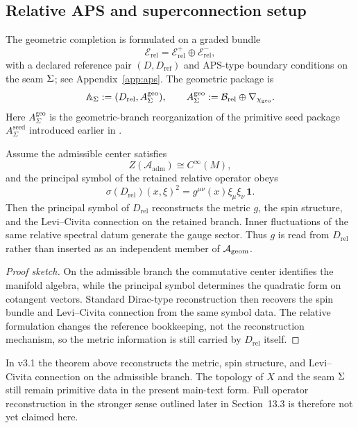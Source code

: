 \subsection{Relative APS and superconnection setup}

The geometric completion is formulated on a graded bundle
\[
\mathcal E_{\mathrm{rel}}=\mathcal E_{\mathrm{rel}}^+\oplus\mathcal E_{\mathrm{rel}}^-,
\]
with a declared reference pair $(D,D_{\mathrm{ref}})$ and APS-type boundary conditions on the seam $\Sigma$; see Appendix~\ref{app:aps}. The geometric package is
\[
\mathbb A_{\Sigma}:=(D_{\mathrm{rel}},A_{\Sigma}^{\mathrm{geo}}),
\qquad
A_{\Sigma}^{\mathrm{geo}}:=\mathcal B_{\mathrm{rel}}\oplus\nabla_{\chi_{\mathrm{geo}}}.
\]
Here $A_{\Sigma}^{\mathrm{geo}}$ is the geometric-branch reorganization of the primitive seed package $A_{\Sigma}^{\mathrm{seed}}$ introduced earlier in .
\begin{theorem}
\label{thm:relative-geometric-reconstruction}
Assume the admissible center satisfies
\[
Z(\mathcal A_{\mathrm{adm}})\cong C^\infty(M),
\]
and the principal symbol of the retained relative operator obeys
\[
\sigma(D_{\mathrm{rel}})(x,\xi)^2
=
g^{\mu\nu}(x)\xi_\mu\xi_\nu\,\mathbf 1.
\]
Then the principal symbol of $D_{\mathrm{rel}}$ reconstructs the metric $g$, the spin structure, and the Levi--Civita connection on the retained branch. Inner fluctuations of the same relative spectral datum generate the gauge sector. Thus $g$ is read from $D_{\mathrm{rel}}$ rather than inserted as an independent member of $\mathcal A_{\mathrm{geom}}$.
\end{theorem}

\begin{proof}[Proof sketch]
On the admissible branch the commutative center identifies the manifold algebra, while the principal symbol determines the quadratic form on cotangent vectors. Standard Dirac-type reconstruction then recovers the spin bundle and Levi--Civita connection from the same symbol data. The relative formulation changes the reference bookkeeping, not the reconstruction mechanism, so the metric information is still carried by $D_{\mathrm{rel}}$ itself.
\end{proof}

\begin{remark}
In v3.1 the theorem above reconstructs the metric, spin structure, and Levi--Civita connection on the admissible branch. The topology of $X$ and the seam $\Sigma$ still remain primitive data in the present main-text form. Full operator reconstruction in the stronger sense outlined later in Section~13.3 is therefore not yet claimed here.
\end{remark}

